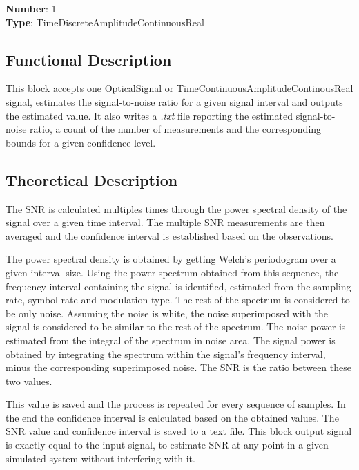 \begin{refsection}
\textbf{Number}: 1\\
\textbf{Type}: TimeDiscreteAmplitudeContinuousReal

\subsection*{Functional Description}

This block accepts one OpticalSignal or TimeContinuousAmplitudeContinousReal signal, estimates the signal-to-noise ratio for a given signal interval and outputs the estimated value. It also writes a \textit{.txt} file reporting the estimated signal-to-noise ratio, a count of the number of measurements and the corresponding bounds for a given confidence level.

\subsection*{Theoretical Description}\label{snrcalc}
The SNR is calculated multiples times through the power spectral density of the signal over a given time interval. The multiple SNR measurements are then averaged and the confidence interval is established based on the observations.

The power spectral density is obtained by getting Welch's periodogram over a given interval size. Using the power spectrum obtained from this sequence, the frequency interval containing the signal is identified, estimated from the sampling rate, symbol rate and modulation type. The rest of the spectrum is considered to be only noise.
Assuming the noise is white, the noise superimposed with the signal is considered to be similar to the rest of the spectrum. The noise power is estimated from the integral of the spectrum in noise area. The signal power is obtained by integrating the spectrum within the signal's frequency interval, minus the corresponding superimposed noise. The SNR is the ratio between these two values.

This value is saved and the process is repeated for every sequence of samples. In the end the confidence interval is calculated based on the obtained values. The SNR value and confidence interval is saved to a text file.
This block output signal is exactly equal to the input signal, to estimate SNR at any point in a given simulated system without interfering with it.



\end{refsection}
